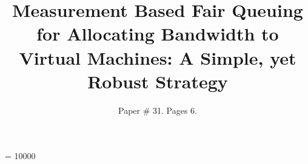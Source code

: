 \documentclass{sig-alternate-10pt}
\begin{document}
\widowpenalty = 10000

\title{Measurement Based Fair Queuing for Allocating Bandwidth to Virtual Machines: A Simple, yet Robust Strategy}

\author{Paper \# 31. Pages 6.}

\maketitle








\end{document}
